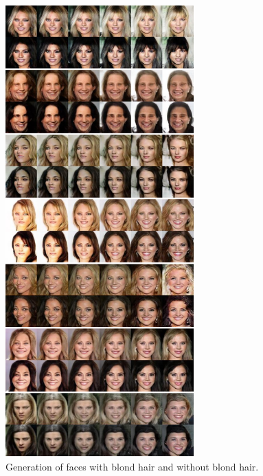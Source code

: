 \begin{figure}[thb!]
\centering
\includegraphics[trim=0in 0in 0in 0in, width=0.65\textwidth]{result_face_blondhair_big2.pdf}
\caption{Generation of faces with blond hair and without blond hair.}
\label{fig::result_blondhair2}
\end{figure}
